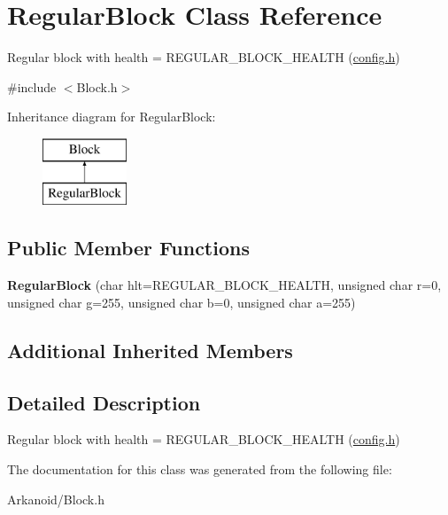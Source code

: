 \hypertarget{class_regular_block}{}\section{Regular\+Block Class Reference}
\label{class_regular_block}


Regular block with health = R\+E\+G\+U\+L\+A\+R\+\_\+\+B\+L\+O\+C\+K\+\_\+\+H\+E\+A\+L\+TH (\hyperlink{_config_8h_source}{config.\+h})  




{\ttfamily \#include $<$Block.\+h$>$}

Inheritance diagram for Regular\+Block\+:\begin{figure}[H]
\begin{center}
\leavevmode
\includegraphics[height=2.000000cm]{class_regular_block}
\end{center}
\end{figure}
\subsection*{Public Member Functions}
\begin{DoxyCompactItemize}
\item 
\mbox{\label{class_regular_block_ae9eba20f97d945197d7ce511fd64daa6}} 
{\bfseries Regular\+Block} (char hlt=R\+E\+G\+U\+L\+A\+R\+\_\+\+B\+L\+O\+C\+K\+\_\+\+H\+E\+A\+L\+TH, unsigned char r=0, unsigned char g=255, unsigned char b=0, unsigned char a=255)
\end{DoxyCompactItemize}
\subsection*{Additional Inherited Members}


\subsection{Detailed Description}
Regular block with health = R\+E\+G\+U\+L\+A\+R\+\_\+\+B\+L\+O\+C\+K\+\_\+\+H\+E\+A\+L\+TH (\hyperlink{_config_8h_source}{config.\+h}) 

The documentation for this class was generated from the following file\+:\begin{DoxyCompactItemize}
\item 
Arkanoid/Block.\+h\end{DoxyCompactItemize}
